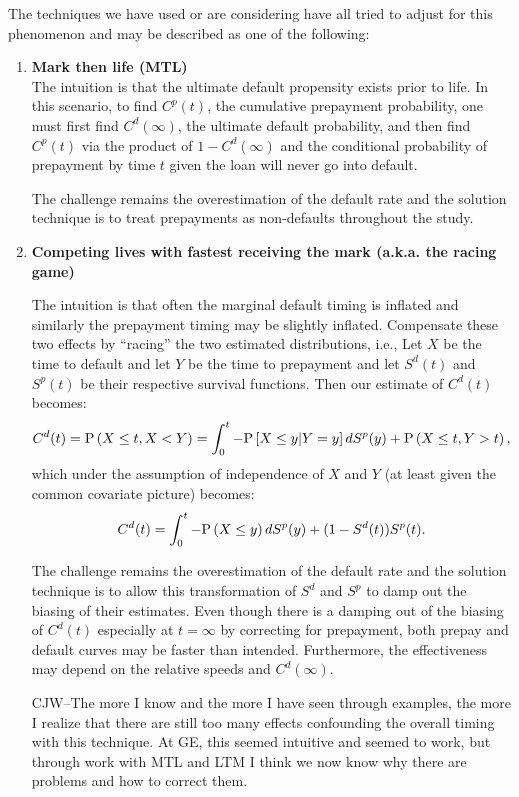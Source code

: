 \documentclass[10pt]{article}
\begin{document}
The techniques we have used or are considering have all 
tried to adjust for this phenomenon and
may be described as one of the following:
\begin{enumerate}
\item {\bf Mark then life (MTL)}\\
	The intuition is that the ultimate default propensity exists prior to life.
	In this scenario, to find $C^p(t)$, the cumulative 
	prepayment probability, one must first find $C^d(\infty)$, the ultimate default probability, and then find $C^p(t)$ via the product of 
	$1-C^d(\infty)$ and the 
	conditional probability of prepayment by time $t$ given the loan will never go into default. 

	The challenge remains the overestimation of the default rate and the solution technique is to treat prepayments as non-defaults 
	throughout the study.

\item {\bf Competing lives with fastest receiving the mark (a.k.a. the racing game)}

	The intuition is that often the marginal default timing is inflated and similarly the prepayment timing may be slightly inflated.
	Compensate these two effects by ``racing'' the two estimated distributions, i.e., Let $X$ be the time to default and let $Y$ be the time 
	to prepayment and let $S^d(t)$ and $S^p(t)$ be their respective survival functions.  Then our estimate of $C^d(t)$ becomes:
	$$C^d(t)=\text{P}\left({X \le t, X<Y}\right)=\int_0^t-\text{P}\left[{{X \le y}|{Y=y}}\right]dS^p(y)+\text{P}\left({X \le t,Y > t}\right),$$
	which under the assumption of independence of $X$ and $Y$ (at least given the common covariate picture) becomes:
	$$C^d(t)=\int_0^t-\text{P}\left({X \le y}\right)dS^p(y)+(1-S^d(t))S^p(t).$$

	The challenge remains the overestimation of the default rate and the solution technique is to allow this 
	transformation of $S^d$ and $S^p$  to damp out the biasing of their estimates.  Even though there is a damping out of the biasing of $C^d(t)$ especially at
	$t=\infty$ by 
	correcting for prepayment, both prepay and default curves may be faster than intended. Furthermore, the effectiveness may depend on the relative speeds 
	and $C^d(\infty)$.  

	CJW--The more I know and the more I have seen through examples, the more I realize that there are still too many effects 
	confounding the overall timing with this technique.  
	At GE, this seemed intuitive and seemed to work, but through work with MTL and LTM I think we now know why there
	are problems and how to correct them.


\end{enumerate}
\end{document}
